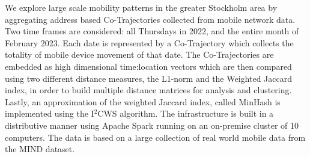 \documentclass[main.tex]{subfiles}
\begin{document}
    We explore large scale mobility patterns in the
    greater Stockholm area by aggregating address based
    Co-Trajectories collected from mobile network data.
    Two time frames are considered: all Thursdays in 2022,
    and the entire month of February 2023. Each date is 
    represented by a Co-Trajectory which collects the totality
    of mobile device movement of that date. The Co-Trajectories 
    are embedded as high dimensional time:location vectors
    which are then compared using two different distance measures,
    the L1-norm and the Weighted Jaccard index, in order to build multiple 
    distance matrices for analysis and clustering.
    Lastly, an approximation of the weighted Jaccard index, called 
    MinHash is implemented using the I$^2$CWS algorithm.
    The infrastructure is built in a distributive manner using Apache Spark running on an on-premise cluster of 10 computers. The data is based on a large collection of real world mobile data from the MIND dataset.
\end{document}
